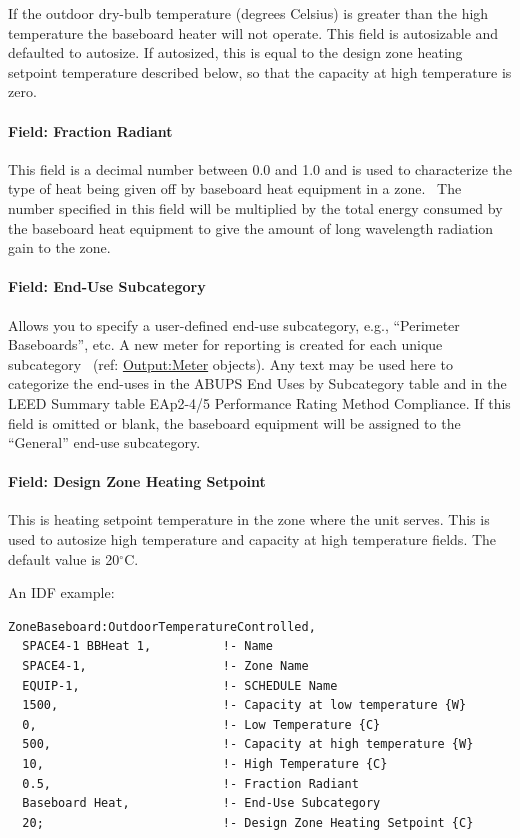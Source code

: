 If the outdoor dry-bulb temperature (degrees Celsius) is greater than the high temperature the baseboard heater will not operate. This field is autosizable and defaulted to autosize. If autosized, this is equal to the design zone heating setpoint temperature described below, so that the capacity at high temperature is zero.

\paragraph{Field: Fraction Radiant}\label{field-fraction-radiant-7}

This field is a decimal number between 0.0 and 1.0 and is used to characterize the type of heat being given off by baseboard heat equipment in a zone.~ The number specified in this field will be multiplied by the total energy consumed by the baseboard heat equipment to give the amount of long wavelength radiation gain to the zone.

\paragraph{Field: End-Use Subcategory}\label{field-end-use-subcategory-5}

Allows you to specify a user-defined end-use subcategory, e.g., ``Perimeter Baseboards'', etc. A new meter for reporting is created for each unique subcategory~ (ref: \hyperref[outputmeter-and-outputmetermeterfileonly]{Output:Meter} objects). Any text may be used here to categorize the end-uses in the ABUPS End Uses by Subcategory table and in the LEED Summary table EAp2-4/5 Performance Rating Method Compliance. If this field is omitted or blank, the baseboard equipment will be assigned to the ``General'' end-use subcategory.

\paragraph{Field: Design Zone Heating Setpoint}\label{field-design-zone-heating-setpoint}

This is heating setpoint temperature in the zone where the unit serves. This is used to autosize high temperature and capacity at high temperature fields. The default value is 20$^\circ$C.

An IDF example:

\begin{lstlisting}
ZoneBaseboard:OutdoorTemperatureControlled,
  SPACE4-1 BBHeat 1,          !- Name
  SPACE4-1,                   !- Zone Name
  EQUIP-1,                    !- SCHEDULE Name
  1500,                       !- Capacity at low temperature {W}
  0,                          !- Low Temperature {C}
  500,                        !- Capacity at high temperature {W}
  10,                         !- High Temperature {C}
  0.5,                        !- Fraction Radiant
  Baseboard Heat,             !- End-Use Subcategory
  20;                         !- Design Zone Heating Setpoint {C}
\end{lstlisting}

